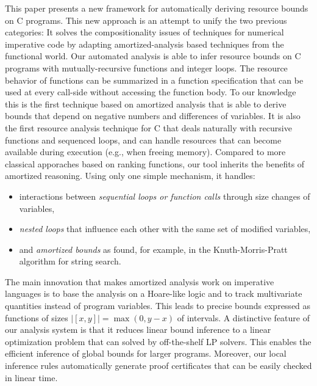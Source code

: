 \documentclass[nocopyrightspace,preprint,pldi]{sigplanconf-pldi15}
\newcommand{\ifshort}[2]{\ifx\fullversion\undefined{#1}\else{#2}\fi}
\newcommand{\itemskip}[0]{\ifshort{\vspace{-3pt}}{}}
\newcommand{\itemskipIn}[0]{\ifshort{\vspace{-1pt}}{}}
\begin{document}
This paper presents a new framework for automatically
deriving resource bounds on C programs.  This new
approach is an attempt to unify the two previous
categories: It solves the compositionality issues of techniques
for numerical imperative code by adapting amortized-analysis based
techniques from the functional world.
%
Our automated analysis is able to infer
resource bounds on C programs with mutually-recursive functions and integer loops.
%
The resource behavior of functions can be summarized
in a function specification that can be used at every
call-side without accessing the function body.
%
To our knowledge this is the first technique based on
amortized analysis that is able to derive bounds that depend on negative numbers
and differences of variables.  It is also the first
resource analysis technique for C that deals naturally with
recursive functions and sequenced loops, and can handle resources that can
become available during execution (e.g., when freeing
memory).  Compared to more classical
apporaches based on ranking functions, our tool inherits
the benefits of amortized reasoning.  Using only one
simple mechanism, it handles:
\itemskip
\begin{itemize}
\item interactions between \emph{sequential loops or
  function calls} through size changes of variables,
\itemskipIn
\item \emph{nested loops} that influence each other
  with the same set of modified variables,
\itemskipIn
\item and \emph{amortized bounds} as found, for example, in
  the Knuth-Morris-Pratt algorithm for string search.
\end{itemize}
\itemskip
The main innovation that makes amortized analysis work
on imperative languages is to base the analysis on a
Hoare-like logic and to track multivariate quantities instead
of program variables.  This leads to precise bounds
expressed as functions of sizes $|[x, y]| = \max(0, y-x)$ of
intervals.
%
A distinctive feature of our analysis system is that
it reduces linear bound inference  to a linear optimization problem
that can solved by off-the-shelf LP solvers.  This enables the
efficient inference of global bounds for larger programs.
%
Moreover, our local inference rules automatically generate
proof certificates that can be easily checked in linear time.
\end{document}
